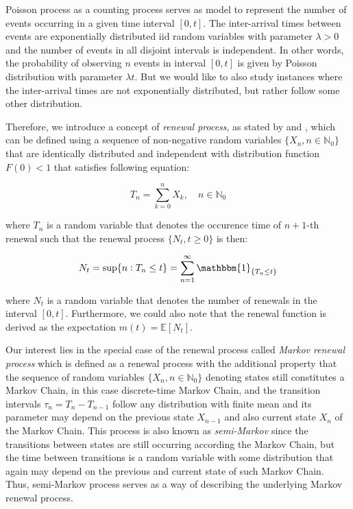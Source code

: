 Poisson process as a counting process serves as model to represent the number of events occurring in a given time interval $[0,t]$. The inter-arrival times 
between events are exponentially distributed iid random variables with parameter $\lambda>0$ and the number of events in all disjoint intervals is independent.
In other words, the probability of observing $n$ events in interval $[0,t]$ is given by Poisson distribution with parameter $\lambda t$. But we would like to also
study instances where the inter-arrival times are not exponentially distributed, but rather follow some other distribution.

Therefore, we introduce a concept of \textit{renewal process}, as stated by \citep{Praskova2012} and \citep{Mitov2014}, which can be defined using a sequence of non-negative random variables $\{X_n,n \in \mathbb{N}_0\}$ that are identically distributed and independent with 
distribution function $F(0)<1$ that satisfies following equation:

\begin{equation}
    T_n = \sum_{k=0}^{n} X_k, \quad n \in \mathbb{N}_0
\end{equation}

where $T_n$ is a random variable that denotes the occurence time of $n+1$-th renewal such that the renewal process $\{N_t,t \geq 0\}$ is then:

\begin{equation}
    N_t = \sup\{n: T_n \leq t\} = \sum_{n=1}^{\infty} \mathbbm{1}_{\{T_n \leq t\}}
\end{equation}

where $N_t$ is a random variable that denotes the number of renewals in the interval $[0,t]$. Furthermore, we could also note that the renewal function is 
derived as the expectation $m(t)=\mathbb{E}[N_t]$.

Our interest lies in the special case of the renewal process called \textit{Markov renewal process} which is defined as a renewal process with the additional property 
that the sequence of random variables $\{X_n,n \in \mathbb{N}_0\}$ denoting states still constitutes a Markov Chain, in this case discrete-time Markov Chain, and the transition intervals $\tau_n = T_n - T_{n-1}$ follow
any distribution with finite mean and its parameter may depend on the previous state $X_{n-1}$ and also current state $X_n$ of the Markov Chain. This process is also known as
\textit{semi-Markov} since the transitions between states are still occurring according the Markov Chain, but the time between transitions is a random variable with some distribution that again
may depend on the previous and current state of such Markov Chain. Thus, semi-Markov process serves as a way of describing the underlying Markov renewal process.~\citep{Medhi2012}

